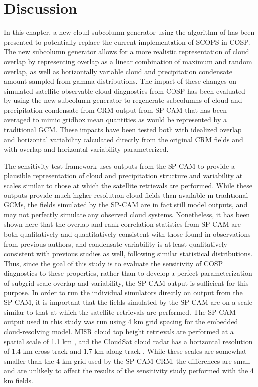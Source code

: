 \section{Discussion}\label{sec:subgrid2Discussion}

In this chapter, a new cloud subcolumn generator using the algorithm of
\citet{raisanen_et_al_2004} has been presented to potentially replace
the current implementation of SCOPS in COSP. The new subcolumn generator
allows for a more realistic representation of cloud overlap by
representing overlap as a linear combination of maximum and random
overlap, as well as horizontally variable cloud and precipitation
condensate amount sampled from gamma distributions. The impact of these
changes on simulated satellite-observable cloud diagnostics from COSP
has been evaluated by using the new subcolumn generator to regenerate
subcolumns of cloud and precipitation condensate from CRM output from
SP-CAM that has been averaged to mimic gridbox mean quantities as would
be represented by a traditional GCM. These impacts have been tested both
with idealized overlap and horizontal variability calculated directly
from the original CRM fields and with overlap and horizontal variability
parameterized.

The sensitivity test framework uses outputs from the SP-CAM to provide a
plausible representation of cloud and precipitation structure and
variability at scales similar to those at which the satellite retrievals
are performed. While these outputs provide much higher resolution cloud
fields than available in traditional GCMs, the fields simulated by the
SP-CAM are in fact still model outputs, and may not perfectly simulate
any observed cloud systems. Nonetheless, it has been shown here that the
overlap and rank correlation statistics from SP-CAM are both
qualitatively and quantitatively consistent with those found in
observations from previous authors, and condensate variability is at
least qualitatively consistent with previous studies as well, following
similar statistical distributions. Thus, since the goal of this study is
to evaluate the sensitivity of COSP diagnostics to these properties,
rather than to develop a perfect parameterization of subgrid-scale
overlap and variability, the SP-CAM output is sufficient for this
purpose. In order to run the individual simulators directly on output
from the SP-CAM, it is important that the fields simulated by the SP-CAM
are on a scale similar to that at which the satellite retrievals are
performed. The SP-CAM output used in this study was run using 4 km grid
spacing for the embedded cloud-resolving model. MISR cloud top height
retrievals are performed at a spatial scale of 1.1 km
\citep{moroney_et_al_2002}, and the CloudSat cloud radar has a
horizontal resolution of 1.4 km cross-track and 1.7 km along-track
\citep{tanelli_et_al_2008}. While these scales are somewhat smaller than
the 4 km grid used by the SP-CAM CRM, the differences are small and are
unlikely to affect the results of the sensitivity study performed with
the 4 km fields.

